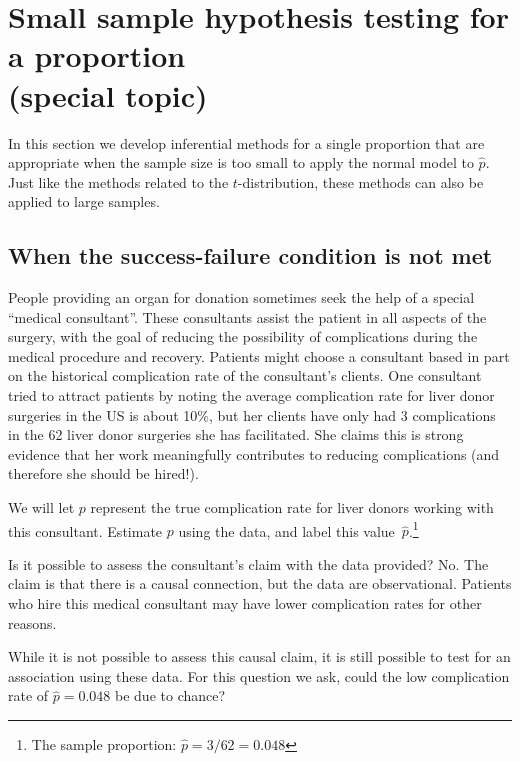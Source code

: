 
\section[Small sample hypothesis testing for a proportion (special topic)]{Small sample hypothesis testing for a proportion\\(special topic)~}
\label{smallSampleHTForProportion}

In this section we develop inferential methods for a single proportion that are appropriate when the sample size is too small to apply the normal model to $\hat{p}$. Just like the methods related to the $t$-distribution, these methods can also be applied to large samples.

\subsection{When the success-failure condition is not met}

People providing an organ for donation sometimes seek the help of a special ``medical consultant''. These consultants assist the patient in all aspects of the surgery, with the goal of reducing the possibility of complications during the medical procedure and recovery. Patients might choose a consultant based in part on the historical complication rate of the consultant's clients. One consultant tried to attract patients by noting the average complication rate for liver donor surgeries in the US is about 10\%, but her clients have only had 3 complications in the 62 liver donor surgeries she has facilitated. She claims this is strong evidence that her work meaningfully contributes to reducing complications (and therefore she should be hired!).

\begin{exercise}
We will let $p$ represent the true complication rate for liver donors working with this consultant. Estimate $p$ using the data, and label this value~$\hat{p}$.\footnote{The sample proportion: $\hat{p} = 3/62 = 0.048$}
\end{exercise}

\begin{example}{Is it possible to assess the consultant's claim with the data provided?}
No. The claim is that there is a causal connection, but the data are observational. Patients who hire this medical consultant may have lower complication rates for other reasons.

While it is not possible to assess this causal claim, it is still possible to test for an association using these data. For this question we ask, could the low complication rate of $\hat{p} = 0.048$ be due to chance?
\end{example}


